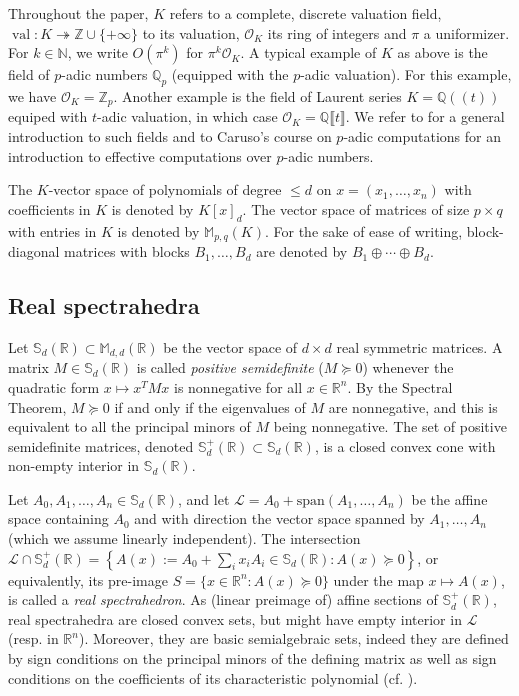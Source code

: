 \documentclass[a4paper,12pt]{article}
\newcommand{\R}{\mathbb{R}} %
\newcommand{\N}{\mathbb{N}} %
\newcommand{\allmat}{\mathbb{M}} %
\newcommand{\sym}{\mathbb{S}} %
\renewcommand{\span}[1]{{\text{span}(#1)}} %
\newcommand{\calL}{\mathcal{L}} %
\DeclareMathOperator{\val}{val}
\def\QQ{\ensuremath{\mathbb{Q}}}
\def\ZZ{\ensuremath{\mathbb{Z}}}
\newcommand{\OK}{\mathcal{O}_K}
\begin{document}
Throughout the paper, $K$ refers to a complete,
discrete valuation field, $\val : K \twoheadrightarrow \ZZ \cup \{+\infty\}$ to its valuation,
$\OK$ its ring of integers and $\pi$ a uniformizer.
For $k \in \N$, we write $O(\pi^k)$ for $\pi^k \OK$.
A typical example of $K$ as above is the field of $p$-adic numbers 
$\QQ_p$ (equipped with the $p$-adic valuation). For this example, we 
have $\OK = \ZZ_p$.
Another example is the field of Laurent series
$K=\QQ(\!(t)\!)$ equiped with $t$-adic valuation,
in which case $\OK = \QQ \llbracket t \rrbracket$.
We refer to \cite{Serre:1979} for a
general introduction to such fields
and to Caruso's course on $p$-adic computations \cite{caruso_computations_2017}
for an introduction to effective computations over $p$-adic numbers.

The $K$-vector space of polynomials of degree $\leq d$ on $x=(x_1,\ldots,x_n)$
with coefficients in $K$ is denoted by $K[x]_{d}$. The vector space of matrices of
size $p \times q$ with entries in $K$ is denoted by $\allmat_{p,q}(K)$. For the sake
of ease of writing, block-diagonal matrices with blocks $B_1,\ldots,B_d$ are denoted by
$B_1 \oplus \cdots \oplus B_d$.

\subsection{Real spectrahedra}

Let $\sym_d(\R) \subset \allmat_{d,d}(\R)$ be the vector space of $d \times d$ real symmetric
matrices. A matrix $M \in \sym_d(\R)$
is called \emph{positive semidefinite} ($M \succeq 0$) whenever the quadratic
form $x \mapsto x^TMx$ is nonnegative for all $x\in \R^n$. By the Spectral Theorem, $M \succeq 0$
if and only if the eigenvalues of $M$ are nonnegative, and this is equivalent to all the principal minors
of $M$ being nonnegative. The set of positive semidefinite matrices, denoted $\sym_d^+(\R) \subset \sym_d(\R)$,
is a closed convex cone with non-empty interior in $\sym_d(\R)$.

Let $A_0,A_1,\ldots,A_n \in \sym_d(\R)$, and let $\calL = A_0+\span{A_1,\ldots,A_n}$ be the affine space
containing $A_0$ and with direction the vector space spanned by $A_1,\ldots,A_n$ (which we assume linearly
independent). The intersection $\calL \cap \sym_d^+(\R) = \left\{A(x) := A_0+\sum_i x_i A_i \in \sym_d(\R) :
A(x) \succeq 0\right\}$, or
equivalently, its pre-image $S = \{x \in \R^n : A(x) \succeq 0\}$ under the map $x \mapsto A(x)$, is called
a \emph{real spectrahedron}. As (linear preimage of) affine sections of $\sym_d^+(\R)$, real spectrahedra
are closed convex sets, but might have empty interior in $\calL$ (resp. in $\R^n$).
Moreover, they are basic semialgebraic sets, indeed they are defined by sign conditions on the principal
minors of the defining matrix as well as sign conditions on the coefficients of its characteristic polynomial
(cf. ).
\end{document}
